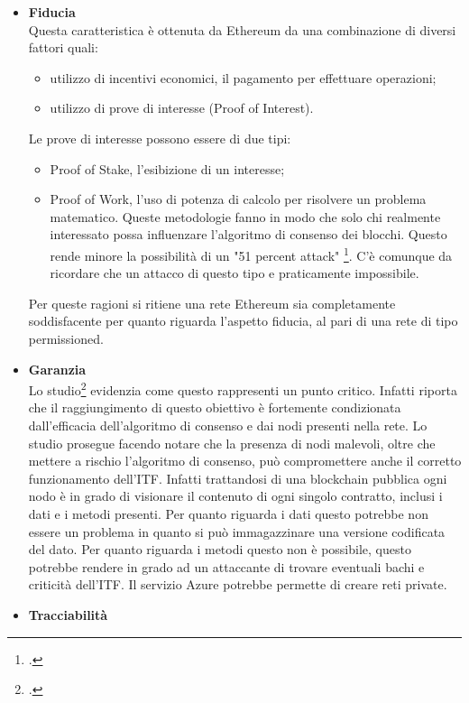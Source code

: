 \begin{itemize}
    \item \textbf{Fiducia} \\
    Questa caratteristica è ottenuta da Ethereum da una combinazione di diversi fattori quali:
    \begin{itemize}
        \item utilizzo di incentivi economici, il pagamento per effettuare operazioni;
        \item utilizzo di prove di interesse (Proof of Interest).
    \end{itemize}
    Le prove di interesse possono essere di due tipi:
    \begin{itemize}
        \item Proof of Stake, l’esibizione di un interesse;
        \item Proof of Work, l’uso di potenza di calcolo per risolvere un problema matematico.
        Queste metodologie fanno in modo che solo chi realmente interessato possa influenzare l’algoritmo di consenso dei blocchi. Questo rende minore la possibilità di un "51 percent attack" \footcite{site:51-attack}. C’è comunque da ricordare che un attacco di questo tipo e praticamente impossibile.
    \end{itemize}
    Per queste ragioni si ritiene una rete Ethereum sia completamente soddisfacente per quanto riguarda l’aspetto fiducia, al pari di una rete di tipo permissioned.
    \item \textbf{Garanzia}\\
    Lo studio\footcite{farah:The-Dawn-of-Decentralized-Identity} evidenzia come questo rappresenti un punto critico. Infatti riporta che il raggiungimento di questo obiettivo è fortemente condizionata dall’efficacia dell’algoritmo di consenso e dai nodi presenti nella rete. Lo studio prosegue facendo notare che la presenza di nodi malevoli, oltre che mettere a rischio l’algoritmo di consenso, può compromettere anche il corretto funzionamento dell’ITF. Infatti trattandosi di una blockchain pubblica ogni nodo è in grado di visionare il contenuto di ogni singolo contratto, inclusi i dati e i metodi presenti. Per quanto riguarda i dati questo potrebbe non essere un problema in quanto si può immagazzinare una versione codificata del dato. Per quanto riguarda i metodi questo non è possibile, questo potrebbe rendere in grado ad un attaccante di trovare eventuali bachi e criticità dell’ITF. Il servizio Azure potrebbe permette di creare reti private.
    \item \textbf{Tracciabilità}\\

\end{itemize}
